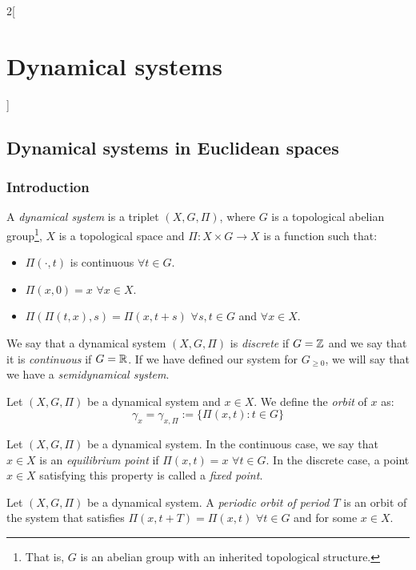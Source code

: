\documentclass[../../../main_math.tex]{subfiles}
\begin{document}
\renewcommand{\col}{\apl}
\begin{multicols}{2}[\section{Dynamical systems}]
  \subsection{Dynamical systems in Euclidean spaces}
  \subsubsection{Introduction}
  \begin{definition}
    A \emph{dynamical system} is a triplet $(X,G,\Pi)$, where $G$ is a topological abelian group\footnote{That is, $G$ is an abelian group with an inherited topological structure.}, $X$ is a topological space and $\Pi:X\times G\rightarrow X$ is a function such that:
    \begin{itemize}
      \item $\Pi(\cdot,t)$ is continuous $\forall t\in G$.
      \item $\Pi(x,0)=x$ $\forall x\in X$.
      \item $\Pi(\Pi(t,x),s)=\Pi(x,t+s)$ $\forall s,t\in G$ and $\forall x\in X$.
    \end{itemize}
    We say that a dynamical system $(X,G,\Pi)$ is \emph{discrete} if $G=\mathbb{Z}$ and we say that it is \emph{continuous} if $G=\mathbb{R}$. If we have defined our system for $G_{\geq 0}$, we will say that we have a \emph{semidynamical system}.
  \end{definition}
  \begin{definition}
    Let $(X,G,\Pi)$ be a dynamical system and $x\in X$. We define the \emph{orbit} of $x$ as: $$\gamma_x=\gamma_{x,\Pi}:=\{\Pi(x,t):t\in G\}$$
  \end{definition}
  \begin{definition}
    Let $(X,G,\Pi)$ be a dynamical system. In the continuous case, we say that $x\in X$ is an \emph{equilibrium point} if $\Pi(x,t)=x$ $\forall t\in G$. In the discrete case, a point $x\in X$ satisfying this property is called a \emph{fixed point}.
  \end{definition}
  \begin{definition}
    Let $(X,G,\Pi)$ be a dynamical system. A \emph{periodic orbit of period $T$} is an orbit of the system that satisfies $\Pi(x,t+T)=\Pi(x,t)$ $\forall t\in G$ and for some $x\in X$.
  \end{definition}

\end{multicols}
\end{document}
